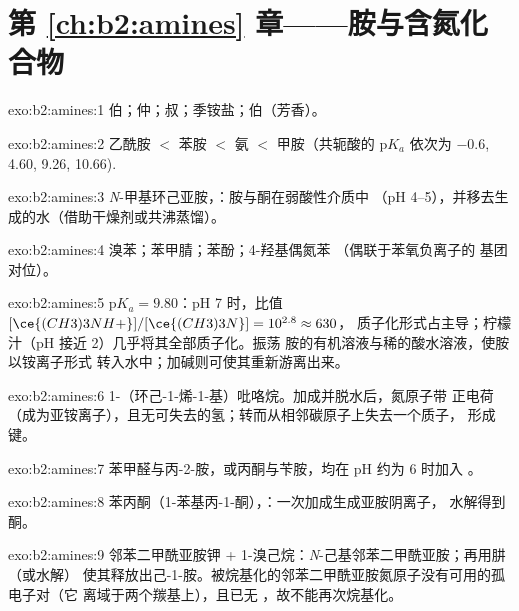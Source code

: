 \section*{第 \ref{ch:b2:amines} 章——胺与含氮化合物}

\begin{solution}{exo:b2:amines:1}
伯；仲；叔；季铵盐；伯（芳香）。
\end{solution}

\begin{solution}{exo:b2:amines:2}
乙酰胺 $<$ 苯胺 $<$ 氨 $<$ 甲胺（共轭酸的 $\mathrm pK_a$ 依次为
$-0.6$, 4.60, 9.26, 10.66).
\end{solution}

\begin{solution}{exo:b2:amines:3}
\textit{N}-甲基环己亚胺，：胺与酮在弱酸性介质中
（pH 4--5），并移去生成的水（借助干燥剂或共沸蒸馏）。
\end{solution}

\begin{solution}{exo:b2:amines:4}
溴苯；苯甲腈；苯酚；4-羟基偶氮苯 （偶联于苯氧负离子的
 基团对位）。
\end{solution}

\begin{solution}{exo:b2:amines:5}
$\mathrm pK_a = 9.80$：pH 7 时，比值 $[\ce{(CH3)3NH+}]/[\ce{(CH3)3N}] = 10^{2.8} \approx 630$，
质子化形式占主导；柠檬汁（pH 接近 2）几乎将其全部质子化。振荡
胺的有机溶液与稀的酸水溶液，使胺以铵离子形式
转入水中；加碱则可使其重新游离出来。
\end{solution}

\begin{solution}{exo:b2:amines:6}
1-（环己-1-烯-1-基）吡咯烷。加成并脱水后，氮原子带
正电荷（成为亚铵离子），且无可失去的氢；转而从相邻碳原子上失去一个质子，
形成  键。
\end{solution}

\begin{solution}{exo:b2:amines:7}
苯甲醛与丙-2-胺，或丙酮与苄胺，均在
pH 约为 6 时加入 。
\end{solution}

\begin{solution}{exo:b2:amines:8}
苯丙酮（1-苯基丙-1-酮），：一次加成生成亚胺阴离子，
水解得到酮。
\end{solution}

\begin{solution}{exo:b2:amines:9}
邻苯二甲酰亚胺钾 + 1-溴己烷：\textit{N}-己基邻苯二甲酰亚胺；再用肼（或水解）
使其释放出己-1-胺。被烷基化的邻苯二甲酰亚胺氮原子没有可用的孤电子对（它
离域于两个羰基上），且已无 ，故不能再次烷基化。
\end{solution}

